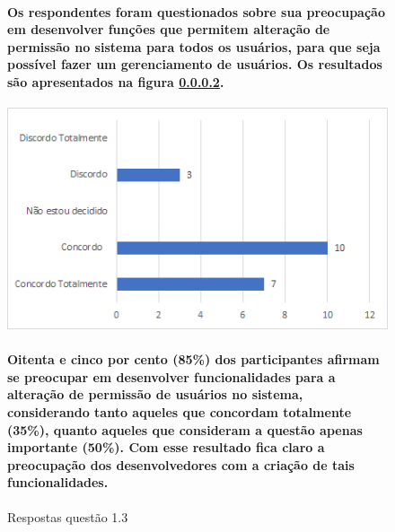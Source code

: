\begin{figure}[!t]
\centering

\paragraph{
Os respondentes foram questionados sobre sua preocupação em desenvolver funções que permitem alteração de permissão no sistema para todos os usuários, para que seja possível fazer um gerenciamento de usuários. Os resultados são apresentados na figura \ref{fig:1.3}.
}
\includegraphics[scale=0.7]{figuras das questoes/1.3.png}
\caption{Respostas questão 1.3}

\paragraph{ 
Oitenta e cinco por cento (85{\%}) dos participantes afirmam se preocupar em desenvolver funcionalidades para a alteração de permissão de usuários no sistema, considerando tanto aqueles que concordam totalmente (35{\%}), quanto aqueles que consideram a questão apenas importante (50{\%}). Com esse resultado fica claro a preocupação dos desenvolvedores com a criação de tais funcionalidades. 
}

\label{fig:1.3}
\end{figure}
